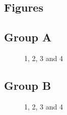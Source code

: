 \subsection{Figures}

\subsection{Group A}

\begin{figure}[H]
	\centering
	\begin{minipage}[b]{0.5\linewidth}
	\end{minipage}\hfill
	\begin{minipage}[b]{0.5\linewidth}
	\end{minipage}\hfill	
	\begin{minipage}[b]{0.5\linewidth}
	\end{minipage}\hfill
	\begin{minipage}[b]{0.5\linewidth}
	\end{minipage}\hfill
	\caption{1, 2, 3 and 4}
	\label{fig:Figure1}
\end{figure} 

\subsection{Group B}

\begin{figure}[H]
	\centering
	\begin{minipage}[b]{0.5\linewidth}
	\end{minipage}\hfill
	\begin{minipage}[b]{0.5\linewidth}
	\end{minipage}\hfill	
	\begin{minipage}[b]{0.5\linewidth}
	\end{minipage}\hfill
	\begin{minipage}[b]{0.5\linewidth}
	\end{minipage}\hfill
	\caption{1, 2, 3 and 4}
	\label{fig:Figure1}
\end{figure} 




